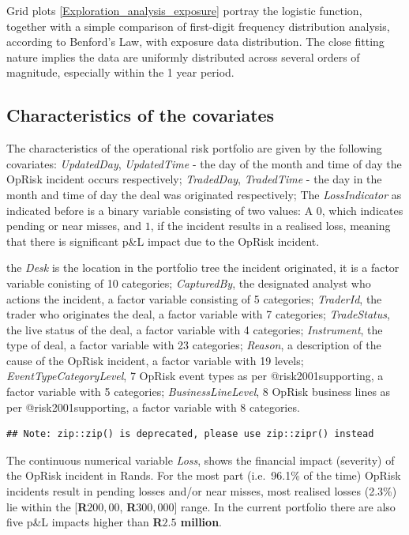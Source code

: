 \documentclass[]{article}
\begin{document}
Grid plots \ref{Exploration_analysis_exposure} portray the logistic
function, together with a simple comparison of first-digit frequency
distribution analysis, according to Benford's Law, with exposure data
distribution. The close fitting nature implies the data are uniformly
distributed across several orders of magnitude, especially within the 1
year period.\medskip

\subsection{Characteristics of the covariates}

The characteristics of the operational risk portfolio are given by the
following covariates: \emph{UpdatedDay}, \emph{UpdatedTime} - the day of
the month and time of day the OpRisk incident occurs respectively;
\emph{TradedDay}, \emph{TradedTime} - the day in the month and time of
day the deal was originated respectively; The \emph{LossIndicator} as
indicated before is a binary variable consisting of two values: A \(0\),
which indicates pending or near misses, and \(1\), if the incident
results in a realised loss, meaning that there is significant p\&L
impact due to the OpRisk incident.\medskip

the \emph{Desk} is the location in the portfolio tree the incident
originated, it is a factor variable conisting of 10 categories;
\emph{CapturedBy}, the designated analyst who actions the incident, a
factor variable consisting of 5 categories; \emph{TraderId}, the trader
who originates the deal, a factor variable with 7 categories;
\emph{TradeStatus}, the live status of the deal, a factor variable with
4 categories; \emph{Instrument}, the type of deal, a factor variable
with 23 categories; \emph{Reason}, a description of the cause of the
OpRisk incident, a factor variable with 19 levels;
\emph{EventTypeCategoryLevel}, 7 OpRisk event types as per
@risk2001supporting, a factor variable with 5 categories;
\emph{BusinessLineLevel}, 8 OpRisk business lines as per
@risk2001supporting, a factor variable with 8 categories.\medskip

\singlespacing

\begin{verbatim}
## Note: zip::zip() is deprecated, please use zip::zipr() instead
\end{verbatim}

\doublespacing

The continuous numerical variable \emph{Loss}, shows the financial
impact (severity) of the OpRisk incident in Rands. For the most part
(i.e.~96.1\% of the time) OpRisk incidents result in pending losses
and/or near misses, most realised losses (2.3\%) lie within the
{[}\textbf{R$200,00$}, \textbf{R$300,000$}{]} range. In the current
portfolio there are also five p\&L impacts higher than
\textbf{R$2.5$ million}.\medskip
\end{document}
